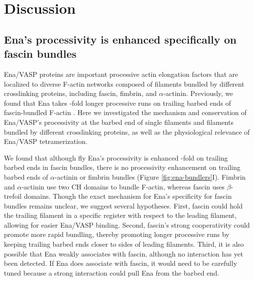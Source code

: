 \section{Discussion}\label{ch02-discussion}

\subsection{Ena's processivity is enhanced specifically on fascin bundles}\label{ena-discuss-specific-fascin}

Ena/VASP proteins are important processive actin elongation factors that are localized to diverse F-actin networks composed of filaments bundled by different crosslinking proteins, including fascin, fimbrin, and $\alpha$-actinin. Previously, we found that Ena takes -fold longer processive runs on trailing barbed ends of fascin-bundled F-actin \citep{winkelman_ena/vasp_2014}. Here we investigated the mechanism and conservation of Ena/VASP's processivity at the barbed end of single filaments and filaments bundled by different crosslinking proteins, as well as the physiological relevance of Ena/VASP tetramerization.

We found that although fly Ena's processivity is enhanced -fold on trailing barbed ends in fascin bundles, there is no processivity enhancement on trailing barbed ends of $\alpha$-actinin or fimbrin bundles (Figure \ref{fig:ena-bundlers}I). Fimbrin and $\alpha$-actinin use two CH domains to bundle F-actin, whereas fascin uses $\beta$-trefoil domains. Though the exact mechanism for Ena's specificity for fascin bundles remains unclear, we suggest several hypotheses. First, fascin could hold the trailing filament in a specific register with respect to the leading filament, allowing for easier Ena/VASP binding. Second, fascin's strong cooperativity \citep{yamakita_phosphorylation_1996,winkelman_fascin-_2016} could promote more rapid bundling, thereby promoting longer processive runs by keeping trailing barbed ends closer to sides of leading filaments. Third, it is also possible that Ena weakly associates with fascin, although no interaction has yet been detected. If Ena does associate with fascin, it would need to be carefully tuned because a strong interaction could pull Ena from the barbed end. 

